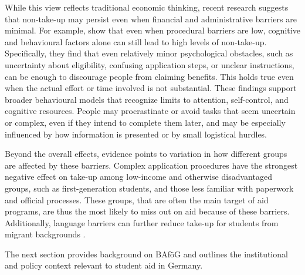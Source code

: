 While this view reflects traditional economic thinking, recent research suggests that non-take-up may persist even when financial and administrative barriers are minimal. 
For example, \cite{bhargava_psychological_2015} show that even when procedural barriers are low, cognitive and behavioural factors alone can still lead to high levels of non-take-up. 
Specifically, they find that even relatively minor psychological obstacles, such as uncertainty about eligibility, confusing application steps, or unclear instructions, can be enough to discourage people from claiming benefits. 
This holds true even when the actual effort or time involved is not substantial. 
These findings support broader behavioural models that recognize limits to attention, self-control, and cognitive resources. 
People may procrastinate or avoid tasks that seem uncertain or complex, even if they intend to complete them later, and may be especially influenced by how information is presented or by small logistical hurdles.

Beyond the overall effects, evidence points to variation in how different groups are affected by these barriers. Complex application procedures have the strongest negative effect on take-up among low-income and otherwise disadvantaged groups, such as first-generation students, and those less familiar with paperwork and official processes. These groups, that are often the main target of aid programs, are thus the most likely to miss out on aid because of these barriers. Additionally, language barriers can further reduce take-up for students from migrant backgrounds \citep{dynarski_cost_2006, bhargava_psychological_2015}.





The next section provides background on BAföG and outlines the institutional and policy context relevant to student aid in Germany.

